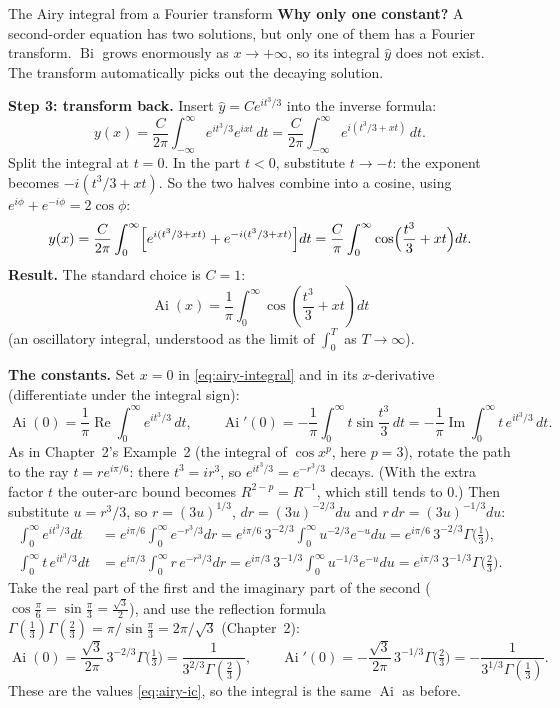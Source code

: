 \documentclass[11pt]{beamer}
\providecommand{\Ai}{\operatorname{Ai}}
\providecommand{\Bi}{\operatorname{Bi}}
\begin{document}
\begin{frame}[allowframebreaks=1.00]{The Airy integral from a Fourier transform}
\textbf{Why only one constant?} A second-order equation has two solutions, but only one of them has
a Fourier transform. \(\Bi\) grows enormously as \(x\to+\infty\), so its integral \(\widehat y\) does not exist. The
transform automatically picks out the decaying solution.


\textbf{Step 3: transform back.} Insert \(\widehat y=Ce^{it^3/3}\) into the inverse formula:
\[
 y(x)=\frac{C}{2\pi}\int_{-\infty}^{\infty}e^{it^3/3}e^{ixt}\,dt
     =\frac{C}{2\pi}\int_{-\infty}^{\infty}e^{i(t^3/3+xt)}\,dt .
\]
Split the integral at \(t=0\). In the part \(t<0\), substitute \(t\to-t\): the exponent becomes
\(-i(t^3/3+xt)\). So the two halves combine into a cosine, using \(e^{i\phi}+e^{-i\phi}=2\cos\phi\):
\[
 y(x)=\frac{C}{2\pi}\int_0^\infty\Bigl[e^{i(t^3/3+xt)}+e^{-i(t^3/3+xt)}\Bigr]dt
 =\frac{C}{\pi}\int_0^\infty\cos\Bigl(\frac{t^3}{3}+xt\Bigr)dt.
\]
\textbf{Result.} The standard choice is \(C=1\):
\begin{equation}
 \Ai(x)=\frac1\pi\int_0^\infty
 \cos\left(\frac{t^3}{3}+xt\right)dt
 \label{eq:airy-integral}
\end{equation}
(an oscillatory integral, understood as the limit of \(\int_0^T\) as \(T\to\infty\)).



\textbf{The constants.} Set \(x=0\) in \eqref{eq:airy-integral} and in its \(x\)-derivative (differentiate under
the integral sign):
\[
 \Ai(0)=\frac1\pi\operatorname{Re}\int_0^\infty e^{it^3/3}\,dt,\qquad
 \Ai'(0)=-\frac1\pi\int_0^\infty t\sin\frac{t^3}{3}\,dt=-\frac1\pi\operatorname{Im}\int_0^\infty t\,e^{it^3/3}\,dt .
\]
As in Chapter~2's Example~2 (the integral of \(\cos x^p\), here \(p=3\)), rotate the path to the ray
\(t=re^{i\pi/6}\): there \(t^3=ir^3\), so \(e^{it^3/3}=e^{-r^3/3}\) decays. (With the extra factor \(t\) the outer-arc
bound becomes \(R^{2-p}=R^{-1}\), which still tends to \(0\).) Then substitute \(u=r^3/3\), so \(r=(3u)^{1/3}\),
\(dr=(3u)^{-2/3}du\) and \(r\,dr=(3u)^{-1/3}du\):
\begin{align*}
 \int_0^\infty e^{it^3/3}dt&=e^{i\pi/6}\int_0^\infty e^{-r^3/3}dr=e^{i\pi/6}\,3^{-2/3}\int_0^\infty u^{-2/3}e^{-u}du=e^{i\pi/6}\,3^{-2/3}\Gamma\bigl(\tfrac13\bigr),\\
 \int_0^\infty t\,e^{it^3/3}dt&=e^{i\pi/3}\int_0^\infty r\,e^{-r^3/3}dr=e^{i\pi/3}\,3^{-1/3}\int_0^\infty u^{-1/3}e^{-u}du=e^{i\pi/3}\,3^{-1/3}\Gamma\bigl(\tfrac23\bigr).
\end{align*}
Take the real part of the first and the imaginary part of the second (\(\cos\frac\pi6=\sin\frac\pi3=\frac{\sqrt3}2\)), and
use the reflection formula \(\Gamma(\frac13)\Gamma(\frac23)=\pi/\sin\frac\pi3=2\pi/\sqrt3\) (Chapter~2):
\[
 \Ai(0)=\frac{\sqrt3}{2\pi}\,3^{-2/3}\Gamma\bigl(\tfrac13\bigr)=\frac{1}{3^{2/3}\Gamma(\frac23)},\qquad
 \Ai'(0)=-\frac{\sqrt3}{2\pi}\,3^{-1/3}\Gamma\bigl(\tfrac23\bigr)=-\frac{1}{3^{1/3}\Gamma(\frac13)} .
\]
These are the values \eqref{eq:airy-ic}, so the integral is the same \(\Ai\) as before.
\end{frame}
\end{document}
